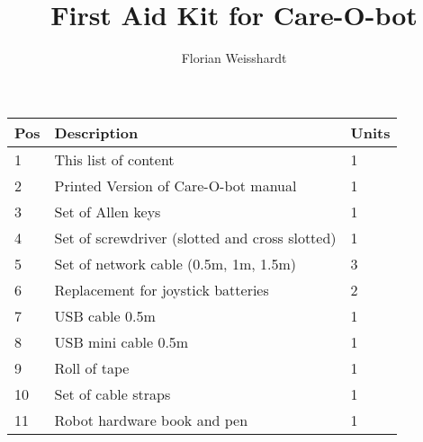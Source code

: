 \documentclass{article}
\title{First Aid Kit for Care-O-bot} %
\author{Florian Weisshardt} %
\begin{document}
\maketitle %

\begin{tabular}{|l|l|l|}
\hline
\textbf{Pos} & \textbf{Description} & \textbf{Units}\\
\hline\hline
1 & This list of content & 1\\
2 & Printed Version of Care-O-bot manual & 1\\
3 & Set of Allen keys & 1\\
4 & Set of screwdriver (slotted and cross slotted) & 1\\
5 & Set of network cable (0.5m, 1m, 1.5m) & 3\\
6 & Replacement for joystick batteries & 2\\
7 & USB cable 0.5m & 1\\
8 & USB mini cable 0.5m & 1\\
9 & Roll of tape & 1\\
10 & Set of cable straps & 1\\
11 & Robot hardware book and pen & 1\\
\hline
\end{tabular}
\end{document}
